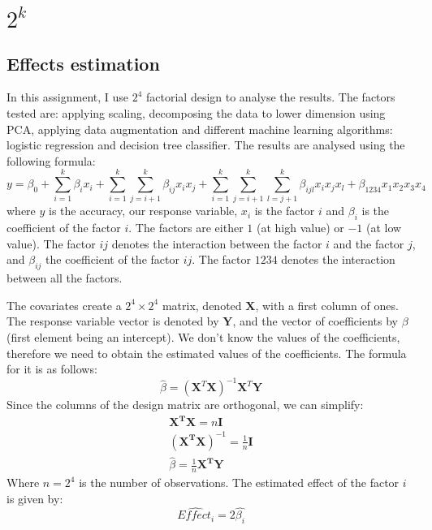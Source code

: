 \documentclass{article}
\begin{document}
\section{\texorpdfstring{$2^k$} }

\subsection{Effects estimation}
In this assignment, I use $2^4$ factorial design to analyse the results. The factors tested are: applying scaling, decomposing the data to lower dimension using PCA, applying data augmentation and different machine learning algorithms: logistic regression and decision tree classifier. The results are analysed using the following formula:
\begin{equation}
    y = \beta_0 + \sum_{i=1}^{k} \beta_i x_i + \sum_{i=1}^{k} \sum_{j=i+1}^{k} \beta_{ij} x_i x_j + \sum_{i=1}^{k} \sum_{j=i+1}^{k} \sum_{l=j+1}^{k} \beta_{ijl} x_i x_j x_l + \beta_{1234} x_1 x_2 x_3 x_4
\end{equation}
where $y$ is the accuracy, our response variable, $x_i$ is the factor $i$ and $\beta_i$ is the coefficient of the factor $i$. The factors are either $1$ (at high value) or $-1$ (at low value). The factor $ij$ denotes the interaction between the factor $i$ and the factor $j$, and $\beta_{ij}$ the coefficient of the factor $ij$. The factor $1234$ denotes the interaction between all the factors.

The covariates create a $2^4\times2^4$ matrix, denoted $\mathbf{X}$, with a first column of ones. The response variable vector is denoted by $\mathbf{Y}$, and the vector of coefficients by $\beta$ (first element being an intercept). We don't know the values of the coefficients, therefore we need to obtain the estimated values of the coefficients. The formula for it is as follows:
\begin{equation}
    \hat{\beta} = (\mathbf{X}^T \mathbf{X})^{-1} \mathbf{X}^T \mathbf{Y}
\end{equation}
Since the columns of the design matrix are orthogonal, we can simplify:
\begin{align}
    \mathbf{X^TX} = n\mathbf{I}                              \\
    \left(\mathbf{X^TX} \right)^{-1} = \frac{1}{n}\mathbf{I} \\
    \hat{\beta} = \frac{1}{n}\mathbf{X^TY}
\end{align}
Where $n=2^4$ is the number of observations. The estimated effect of the factor $i$ is given by:
\begin{equation}
    \widehat{Effect_i} = 2\hat{\beta_i}
\end{equation}
\end{document}
